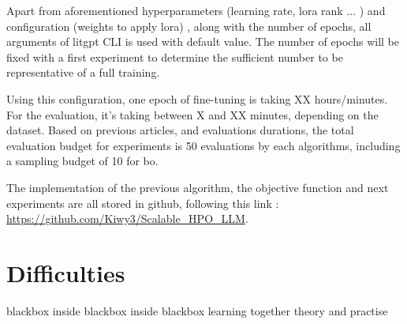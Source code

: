 Apart from aforementioned hyperparameters (learning rate, \acrshort{lora} rank ... ) and configuration (weights to apply \acrshort{lora}) , along with the number of epochs, all arguments of litgpt CLI is used with default value. The number of epochs will be fixed with a first experiment to determine the sufficient number to be representative of a full training. 

Using this configuration, one epoch of fine-tuning is taking XX hours/minutes. For the evaluation, it's taking between X and XX minutes, depending on the dataset. Based on previous articles, and evaluations durations, the total evaluation budget for experiments is 50 evaluations by each algorithms, including a sampling budget of 10 for \acrlong{bo}. 

The implementation of the previous algorithm, the objective function and next experiments are all stored in github, following this link : \href{https://github.com/Kiwy3/Scalable_HPO_LLM}{https://github.com/Kiwy3/Scalable\_HPO\_LLM}.


\section{Difficulties}
\label{sec:opt_difficulties}



blackbox inside blackbox inside blackbox
learning together theory and practise